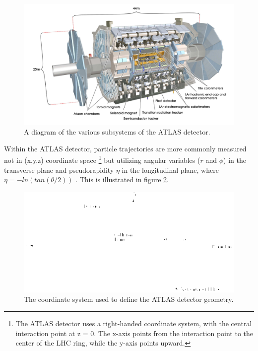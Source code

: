 \begin{figure}
  \includegraphics[width=\linewidth]{figures/detector_chapter/ATLAS.png}
  \caption{A diagram of the various subsystems of the ATLAS detector. \cite{ATLAS_Jinst}}
  \label{fig:ATLAS}
\end{figure}

	 Within the ATLAS detector, particle trajectories are more commonly measured not in (x,y,z) coordinate space \footnote{The ATLAS detector uses a right-handed coordinate system, with the central interaction point at z = 0. The x-axis points from the interaction point to the center of the LHC ring, while the y-axis points upward.} but utilizing angular variables ($r$ and $\phi$) in the transverse plane and pseudorapidity $ \eta $ in the longitudinal plane, where $ \eta = -ln(tan( \theta /2) ) $ . This is illustrated in figure \ref{fig:coords}.

\begin{figure}
  \includegraphics[width=\linewidth]{figures/detector_chapter/coords.png}
  \caption{The coordinate system used to define the ATLAS detector geometry. \cite{coords}}
  \label{fig:coords}
\end{figure}

